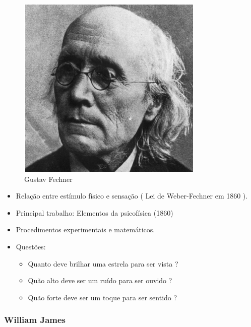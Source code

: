 \documentclass[
]{book}
\providecommand{\tightlist}{%
  \setlength{\itemsep}{0pt}\setlength{\parskip}{0pt}}
\begin{document}
\begin{figure}

{\centering \includegraphics[width=0.5\linewidth]{imagens/GustavFechner} 

}

\caption{Gustav Fechner}\label{fig:unnamed-chunk-3}
\end{figure}

\begin{itemize}
\tightlist
\item
  Relação entre estímulo físico e sensação ( Lei de Weber-Fechner em 1860 ).
\item
  Principal trabalho: Elementos da psicofísica (1860)
\item
  Procedimentos experimentais e matemáticos.
\item
  Questões:

  \begin{itemize}
  \tightlist
  \item
    Quanto deve brilhar uma estrela para ser vista ?
  \item
    Quão alto deve ser um ruído para ser ouvido ?
  \item
    Quão forte deve ser um toque para ser sentido ?
  \end{itemize}
\end{itemize}

\hypertarget{william-james}{%
\subsubsection{William James}\label{william-james}}
\end{document}
